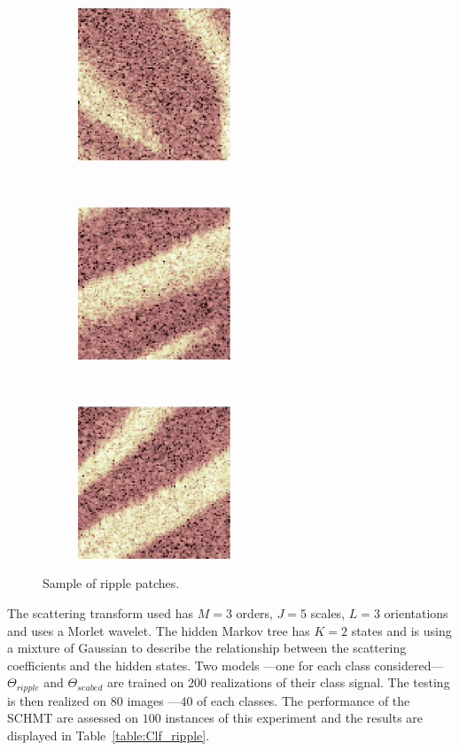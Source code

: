 \documentclass[a4paper,11pt]{report}
\begin{document}
		
		\begin{figure}[h]
			\centering
			\begin{subfigure}[t]{0.3\textwidth}
				\centering
				\includegraphics[height=1.8in]{patch_ripple_1.eps}
			\end{subfigure}%
			~ 
			\begin{subfigure}[t]{0.3\textwidth}
        \centering
        \includegraphics[height=1.8in]{patch_ripple_2.eps}
			\end{subfigure}
			~
			\begin{subfigure}[t]{0.3\textwidth}
        \centering
        \includegraphics[height=1.8in]{patch_ripple_3.eps}
			\end{subfigure}
			\caption{Sample of ripple patches.}
			\label{fig:Ripple patch}
		\end{figure}
		
		The scattering transform used has $M=3$ orders, $J=5$ scales, $L=3$ orientations and uses a Morlet wavelet. The hidden Markov tree has $K=2$ states and is using a mixture of Gaussian to describe the relationship between the scattering coefficients and the hidden states. Two models ---one for each class considered--- $\Theta_{ripple}$ and $\Theta_{seabed}$ are trained on $200$ realizations of their class signal. The testing is then realized on $80$ images ---$40$ of each classes. The performance of the SCHMT are assessed on $100$ instances of this experiment and the results are displayed in Table~\ref{table:Clf_ripple}.\\
		
\end{document}
